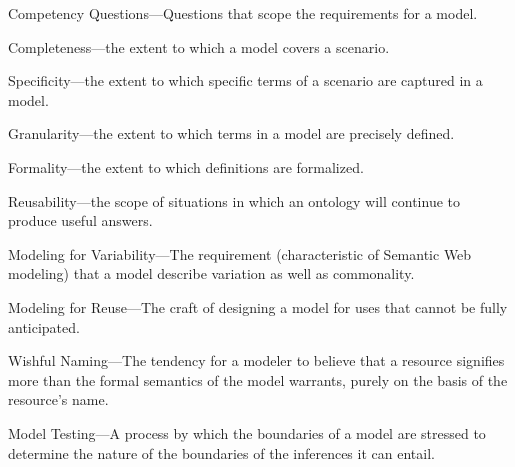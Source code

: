 Competency Questions---Questions that scope the requirements for a
model.

Completeness---the extent to which a model covers a 
scenario.

Specificity---the extent to which specific terms of a scenario are captured in a model.

Granularity---the extent to which terms in a model are precisely defined.

Formality---the extent to 
which definitions are formalized.

Reusability---the scope of situations in which an
ontology will continue to produce useful answers.


Modeling for Variability---The requirement (characteristic of Semantic
Web modeling) that a model describe variation as well as commonality.

Modeling for Reuse---The craft of designing a model for uses that cannot
be fully anticipated.

Wishful Naming---The tendency for a modeler to believe that a resource
signifies more than the formal semantics of the model warrants, purely
on the basis of the resource's name.

Model Testing---A process by which the boundaries of a model are
stressed to determine the nature of the boundaries of the inferences it
can entail.

